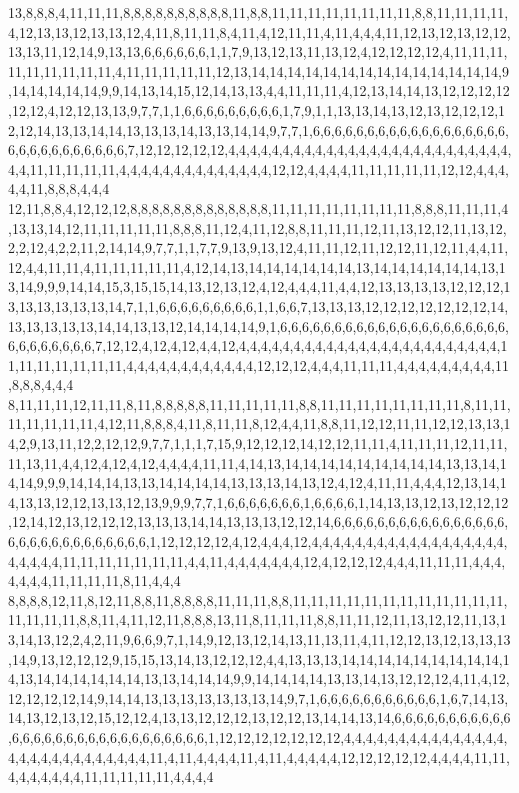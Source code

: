 13,8,8,8,4,11,11,11,8,8,8,8,8,8,8,8,8,8,11,8,8,11,11,11,11,11,11,11,11,8,8,11,11,11,11,4,12,13,13,12,13,13,12,4,11,8,11,11,8,4,11,4,12,11,11,4,11,4,4,4,11,12,13,12,13,12,12,13,13,11,12,14,9,13,13,6,6,6,6,6,6,1,1,7,9,13,12,13,11,13,12,4,12,12,12,12,4,11,11,11,11,11,11,11,11,11,4,11,11,11,11,11,12,13,14,14,14,14,14,14,14,14,14,14,14,14,14,14,9,14,14,14,14,14,9,9,14,13,14,15,12,14,13,13,4,4,11,11,11,4,12,13,14,14,13,12,12,12,12,12,12,4,12,12,13,13,9,7,7,1,1,6,6,6,6,6,6,6,6,6,1,7,9,1,1,13,13,14,13,12,13,12,12,12,12,12,14,13,13,14,14,13,13,13,14,13,13,14,14,9,7,7,1,6,6,6,6,6,6,6,6,6,6,6,6,6,6,6,6,6,6,6,6,6,6,6,6,6,6,6,6,6,7,12,12,12,12,12,4,4,4,4,4,4,4,4,4,4,4,4,4,4,4,4,4,4,4,4,4,4,4,4,4,4,4,4,11,11,11,11,11,4,4,4,4,4,4,4,4,4,4,4,4,4,4,12,12,4,4,4,4,11,11,11,11,11,12,12,4,4,4,4,4,11,8,8,8,4,4,4
12,11,8,8,4,12,12,12,8,8,8,8,8,8,8,8,8,8,8,8,8,11,11,11,11,11,11,11,11,8,8,8,11,11,11,4,13,13,14,12,11,11,11,11,11,8,8,8,11,12,4,11,12,8,8,11,11,11,12,11,13,12,12,11,13,12,2,2,12,4,2,2,11,2,14,14,9,7,7,1,1,7,7,9,13,9,13,12,4,11,11,12,11,12,12,11,12,11,4,4,11,12,4,4,11,11,4,11,11,11,11,11,4,12,14,13,14,14,14,14,14,14,13,14,14,14,14,14,14,13,13,14,9,9,9,14,14,15,3,15,15,14,13,12,13,12,4,12,4,4,4,11,4,4,12,13,13,13,13,12,12,12,13,13,13,13,13,13,14,7,1,1,6,6,6,6,6,6,6,6,6,1,1,6,6,7,13,13,13,12,12,12,12,12,12,12,14,13,13,13,13,13,14,14,13,13,12,14,14,14,14,9,1,6,6,6,6,6,6,6,6,6,6,6,6,6,6,6,6,6,6,6,6,6,6,6,6,6,6,6,6,6,7,12,12,4,12,4,12,4,4,12,4,4,4,4,4,4,4,4,4,4,4,4,4,4,4,4,4,4,4,4,4,4,4,4,11,11,11,11,11,11,11,4,4,4,4,4,4,4,4,4,4,4,4,12,12,12,4,4,4,11,11,11,4,4,4,4,4,4,4,4,4,11,8,8,8,4,4,4
8,11,11,11,12,11,11,8,11,8,8,8,8,8,11,11,11,11,11,8,8,11,11,11,11,11,11,11,11,8,11,11,11,11,11,11,11,4,12,11,8,8,8,4,11,8,11,11,8,12,4,4,11,8,8,11,12,12,11,11,12,12,13,13,14,2,9,13,11,12,2,12,12,9,7,7,1,1,1,7,15,9,12,12,12,14,12,12,11,11,4,11,11,11,12,11,11,11,13,11,4,4,12,4,12,4,12,4,4,4,4,11,11,4,14,13,14,14,14,14,14,14,14,14,14,13,13,14,14,14,9,9,9,14,14,14,13,13,14,14,14,14,13,13,13,14,13,12,4,12,4,11,11,4,4,4,12,13,14,14,13,13,12,12,13,13,12,13,9,9,9,7,7,1,6,6,6,6,6,6,6,1,6,6,6,6,1,14,13,13,12,13,12,12,12,12,14,12,13,12,12,12,13,13,13,14,14,13,13,13,12,12,14,6,6,6,6,6,6,6,6,6,6,6,6,6,6,6,6,6,6,6,6,6,6,6,6,6,6,6,6,6,1,12,12,12,12,4,12,4,4,4,12,4,4,4,4,4,4,4,4,4,4,4,4,4,4,4,4,4,4,4,4,4,4,4,11,11,11,11,11,11,11,4,4,11,4,4,4,4,4,4,4,12,4,12,12,12,4,4,4,11,11,11,4,4,4,4,4,4,4,11,11,11,11,8,11,4,4,4
8,8,8,8,12,11,8,12,11,8,8,11,8,8,8,8,11,11,11,8,8,11,11,11,11,11,11,11,11,11,11,11,11,11,11,11,11,8,8,11,4,11,12,11,8,8,8,13,11,8,11,11,11,8,8,11,11,12,11,13,12,12,11,13,13,14,13,12,2,4,2,11,9,6,6,9,7,1,14,9,12,13,12,14,13,11,13,11,4,11,12,12,13,12,13,13,13,14,9,13,12,12,12,9,15,15,13,14,13,12,12,12,4,4,13,13,13,14,14,14,14,14,14,14,14,14,14,13,14,14,14,14,14,14,13,13,14,14,14,9,9,14,14,14,14,13,13,14,13,12,12,12,4,11,4,12,12,12,12,12,14,9,14,14,13,13,13,13,13,13,13,14,9,7,1,6,6,6,6,6,6,6,6,6,6,6,1,6,7,14,13,14,13,12,13,12,15,12,12,4,13,13,12,12,12,13,12,12,13,14,14,13,14,6,6,6,6,6,6,6,6,6,6,6,6,6,6,6,6,6,6,6,6,6,6,6,6,6,6,6,6,6,1,12,12,12,12,12,12,12,4,4,4,4,4,4,4,4,4,4,4,4,4,4,4,4,4,4,4,4,4,4,4,4,4,4,4,4,11,4,11,4,4,4,4,11,4,11,4,4,4,4,4,12,12,12,12,12,4,4,4,4,11,11,4,4,4,4,4,4,4,11,11,11,11,11,4,4,4,4
